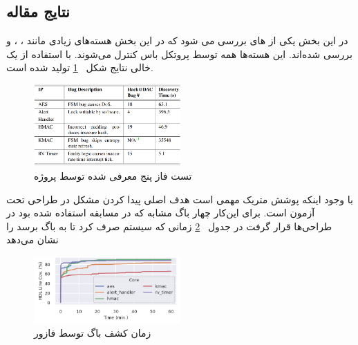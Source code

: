 \documentclass[conference]{IEEEtran}
\begin{document}
\subsection{نتایج مقاله
}
در این بخش یکی از
های
بررسی می شود که در این بخش
هسته‌های زیادی مانند
،
، و
بررسی شده‌اند.
این ‌هسته‌ها همه توسط پروتکل باس
کنترل می‌شوند.
با استفاده از یک
خالی نتایج شکل
~\ref{fig4}
تولید شده است.
\begin{figure}[!t]
    \centering
    \includegraphics[width=0.5\textwidth]{res3.png}
    \caption{
        تست فاز پنج
        معرفی شده توسط پروژه
    }
    \label{fig4}
\end{figure}
با وجود اینکه پوشش متریک مهمی است هدف اصلی پیدا کردن مشکل در
طراحی تحت آزمون است.
برای این‌کار چهار باگ مشابه که در مسابقه
استفاده شده بود در طراحی‌ها قرار گرفت
در جدول
~\ref{fig5}
زمانی که سیستم صرف کرد تا به باگ برسد را نشان می‌دهد
\begin{figure}[!t]
    \centering
    \includegraphics[width=0.5\textwidth]{res2.png}
    \caption{
        زمان کشف باگ توسط فازور
    }
    \label{fig5}
\end{figure}
\end{document}

